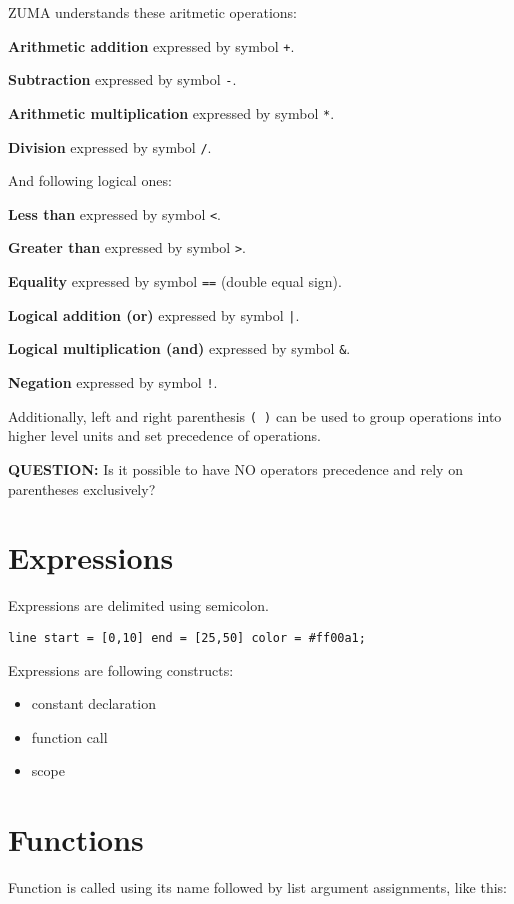 \documentclass{scrreprt}
\newcommand{\zuma}{ZUMA}
\newcommand{\question}[1]{
    \color{red} \textbf{QUESTION:} \color{black} #1
}
\begin{document}
\zuma{} understands these aritmetic operations:

\textbf{Arithmetic addition} expressed by symbol \texttt{+}.

\textbf{Subtraction} expressed by symbol \texttt{-}.

\textbf{Arithmetic multiplication} expressed by symbol \texttt{*}.

\textbf{Division} expressed by symbol \texttt{/}.

And following logical ones:

\textbf{Less than} expressed by symbol \texttt{<}.

\textbf{Greater than} expressed by symbol \texttt{>}.

\textbf{Equality} expressed by symbol \texttt{==} (double equal sign).

\textbf{Logical addition (or)} expressed by symbol \texttt{|}.

\textbf{Logical multiplication (and)} expressed by symbol \texttt{\&}.

\textbf{Negation} expressed by symbol \texttt{!}.

Additionally, left and right parenthesis \texttt{( )} can be used to group operations into higher level units and set precedence of operations.

\question{Is it possible to have NO operators precedence and rely on parentheses exclusively?}


\section{Expressions}

Expressions are delimited using semicolon.

\texttt{line start = [0,10] end = [25,50] color = \#ff00a1;}

Expressions are following constructs:

\begin{itemize}
    \item constant declaration
    \item function call
    \item scope
\end{itemize}


\section{Functions}

Function is called using its name followed by list argument assignments, like this:
\end{document}
